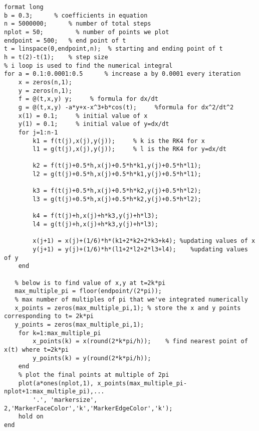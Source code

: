 \lstset{basicstyle=\footnotesize,style=myCustomMatlabStyle}
\begin{lstlisting}
format long
b = 0.3;      % coefficients in equation
n = 5000000;      % number of total steps
nplot = 50;         % number of points we plot
endpoint = 500;   % end point of t 
t = linspace(0,endpoint,n);  % starting and ending point of t
h = t(2)-t(1);    % step size
% i loop is used to find the numerical integral
for a = 0.1:0.0001:0.5      % increase a by 0.0001 every iteration
    x = zeros(n,1);
    y = zeros(n,1);
    f = @(t,x,y) y;     % formula for dx/dt
    g = @(t,x,y) -a*y+x-x^3+b*cos(t);     %formula for dx^2/dt^2
    x(1) = 0.1;     % initial value of x
    y(1) = 0.1;     % initial value of y=dx/dt
    for j=1:n-1
        k1 = f(t(j),x(j),y(j));     % k is the RK4 for x
        l1 = g(t(j),x(j),y(j));     % l is the RK4 for y=dx/dt

        k2 = f(t(j)+0.5*h,x(j)+0.5*h*k1,y(j)+0.5*h*l1);
        l2 = g(t(j)+0.5*h,x(j)+0.5*h*k1,y(j)+0.5*h*l1);

        k3 = f(t(j)+0.5*h,x(j)+0.5*h*k2,y(j)+0.5*h*l2);
        l3 = g(t(j)+0.5*h,x(j)+0.5*h*k2,y(j)+0.5*h*l2);

        k4 = f(t(j)+h,x(j)+h*k3,y(j)+h*l3);
        l4 = g(t(j)+h,x(j)+h*k3,y(j)+h*l3);

        x(j+1) = x(j)+(1/6)*h*(k1+2*k2+2*k3+k4); %updating values of x
        y(j+1) = y(j)+(1/6)*h*(l1+2*l2+2*l3+l4);    %updating values of y
    end
    
   % below is to find value of x,y at t=2k*pi
   max_multiple_pi = floor(endpoint/(2*pi));    
   % max number of multiples of pi that we've integrated numerically
   x_points = zeros(max_multiple_pi,1); % store the x and y points corresponding to t= 2k*pi
   y_points = zeros(max_multiple_pi,1);
    for k=1:max_multiple_pi
        x_points(k) = x(round(2*k*pi/h));    % find nearest point of x(t) where t=2k*pi
        y_points(k) = y(round(2*k*pi/h));   
    end
    % plot the final points at multiple of 2pi
    plot(a*ones(nplot,1), x_points(max_multiple_pi-nplot+1:max_multiple_pi),...
        '.', 'markersize', 2,'MarkerFaceColor','k','MarkerEdgeColor','k');
    hold on
end

\end{lstlisting}
